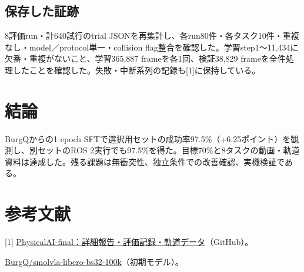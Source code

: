 \documentclass[paper=a4,fontsize=10pt,baselineskip=15pt]{jlreq}
\newcommand{\repo}{https://github.com/lemonydrink/PhysicalAI-final}
\begin{document}
\subsection{保存した証跡}
8評価run・計640試行のtrial JSONを再集計し、各run80件・各タスク10件・重複なし・model／protocol単一・collision flag整合を確認した。学習step1〜11,434に欠番・重複がないこと、学習365,887 frameを各1回、検証38,829 frameを全件処理したことを確認した。失敗・中断系列の記録も[1]に保持している。
\section{結論}
BurgQからの1 epoch SFTで選択用セットの成功率97.5\%（+6.25ポイント）を観測し、別セットのROS 2実行でも97.5\%を得た。目標70\%と8タスクの動画・軌道資料は達成した。残る課題は無衝突性、独立条件での改善確認、実機検証である。
\section{参考文献}
{\small [1] \href{\repo/tree/main/reports/experiment-burgq/final-report}{PhysicalAI-final：詳細報告・評価記録・軌道データ}（GitHub）。\par
[2] \href{https://huggingface.co/BurgQ/smolvla-libero-bs32-100k}{BurgQ/smolvla-libero-bs32-100k}（初期モデル）。}
\end{document}
